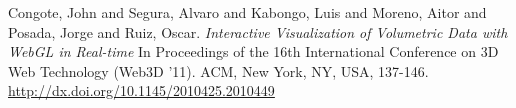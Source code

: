 \begin{thebibliography}{1}

  Congote, John and Segura, Alvaro and Kabongo, Luis and Moreno, Aitor and Posada, Jorge and Ruiz, Oscar.
  \textit{Interactive Visualization of Volumetric Data with WebGL in Real-time}
  In Proceedings of the 16th International Conference on 3D Web Technology (Web3D '11). ACM, New York, NY, USA, 137-146.
  \url{http://dx.doi.org/10.1145/2010425.2010449}
  
\end{thebibliography}
